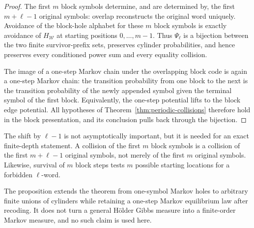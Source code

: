 \begin{proof}
The first \(m\) block symbols determine, and are determined by, the
first \(m+\ell-1\) original symbols: overlap reconstructs the original
word uniquely.  Avoidance of the block-hole alphabet for these \(m\)
block symbols is exactly avoidance of \(H_{\mathcal W}\) at starting
positions \(0,\ldots,m-1\).  Thus \(\Psi_\ell\) is a bijection between
the two finite survivor-prefix sets, preserves cylinder probabilities,
and hence preserves every conditioned power sum and every equality
collision.

The image of a one-step Markov chain under the overlapping block code is
again a one-step Markov chain: the transition probability from one block
to the next is the transition probability of the newly appended symbol
given the terminal symbol of the first block.  Equivalently, the
one-step potential lifts to the block edge potential.  All hypotheses of
Theorem~\ref{thm:periodic-collisions} therefore hold in the block
presentation, and its conclusion pulls back through the bijection.
\end{proof}

\begin{remark}
The shift by \(\ell-1\) is not asymptotically important, but it is needed
for an exact finite-depth statement.  A collision of the first \(m\)
block symbols is a collision of the first \(m+\ell-1\) original symbols,
not merely of the first \(m\) original symbols.  Likewise, survival of
\(m\) block steps tests \(m\) possible starting locations for a forbidden
\(\ell\)-word.
\end{remark}

\begin{remark}
The proposition extends the theorem from one-symbol Markov holes to
arbitrary finite unions of cylinders while retaining a one-step Markov
equilibrium law after recoding.  It does not turn a general H\"older
Gibbs measure into a finite-order Markov measure, and no such claim is
used here.
\end{remark}
